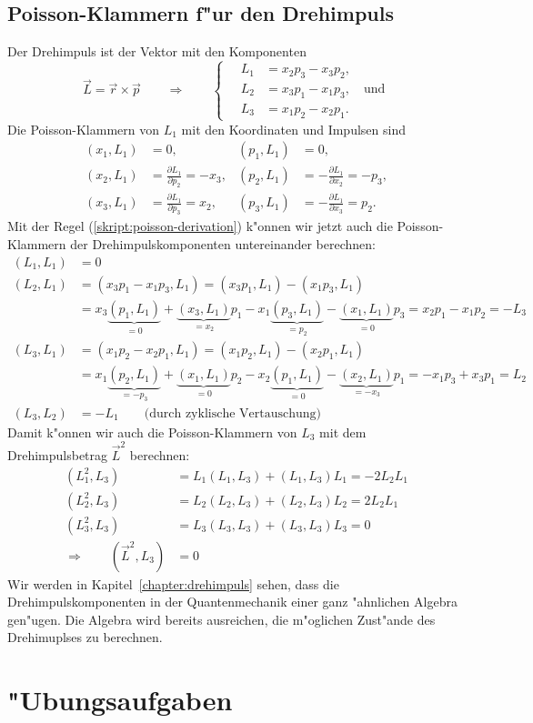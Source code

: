 \subsection{Poisson-Klammern f"ur den Drehimpuls}
Der Drehimpuls ist der Vektor mit den Komponenten
\[
\vec L=\vec r\times \vec p
\qquad\Rightarrow\qquad
\left\{\quad
\begin{aligned}
L_1&=x_2p_3-x_3p_2,\\
L_2&=x_3p_1-x_1p_3,\quad\text{und}\\
L_3&=x_1p_2-x_2p_1.
\end{aligned}
\right.
\]
Die Poisson-Klammern von $L_1$  mit den Koordinaten und Impulsen sind
\begin{align*}
(x_1,L_1)
&=
0,
&
(p_1,L_1)
&=
0,
\\
(x_2,L_1)
&=
\frac{\partial L_1}{\partial p_2}
=
-x_3,
&
(p_2,L_1)
&=
-\frac{\partial L_1}{\partial x_2}
=
-p_3,
\\
(x_3,L_1)
&=
\frac{\partial L_1}{\partial p_3}
=
x_2,
&
(p_3,L_1)
&=
-\frac{\partial L_1}{\partial x_3}
=
p_2.
\end{align*}
Mit der Regel (\ref{skript:poisson-derivation}) k"onnen wir jetzt auch die
Poisson-Klammern der Drehimpulskomponenten untereinander berechnen:
\begin{align*}
(L_1,L_1)&=0
\\
(L_2,L_1)
&=
(x_3p_1-x_1p_3,L_1)
=
(x_3p_1,L_1)-(x_1p_3,L_1)
\\
&=
x_3\underbrace{(p_1,L_1)}_{=0}+\underbrace{(x_3,L_1)}_{=x_2}p_1
-x_1\underbrace{(p_3,L_1)}_{=p_2} -\underbrace{(x_1,L_1)}_{=0}p_3
=
x_2p_1 -x_1p_2=-L_3
\\
(L_3,L_1)
&=
(x_1p_2-x_2p_1,L_1)
=
(x_1p_2,L_1)-(x_2p_1,L_1)
\\
&=
x_1\underbrace{(p_2,L_1)}_{=-p_3} + \underbrace{(x_1,L_1)}_{=0}p_2
- x_2\underbrace{(p_1,L_1)}_{=0} - \underbrace{(x_2,L_1)}_{=-x_3}p_1
=
-x_1p_3+x_3p_1
=L_2
\\
(L_3,L_2)&=-L_1\qquad\text{(durch zyklische Vertauschung)}
\end{align*}
Damit k"onnen wir auch die Poisson-Klammern von $L_3$ mit dem Drehimpulsbetrag
$\vec L^2$ berechnen:
\begin{align*}
(L_1^2,L_3)
&=
L_1(L_1,L_3)+(L_1,L_3)L_1
=
-2L_2L_1
\\
(L_2^2,L_3)
&=
L_2(L_2,L_3)+(L_2,L_3)L_2
=
2L_2L_1
\\
(L_3^2,L_3)&=L_3(L_3,L_3)+(L_3,L_3)L_3=0
\\
\Rightarrow\qquad
(\vec L^2,L_3)
&=0
\end{align*}
Wir werden in Kapitel~\ref{chapter:drehimpuls} sehen,
dass die Drehimpulskomponenten in der
Quantenmechanik einer ganz "ahnlichen Algebra gen"ugen.
Die Algebra wird bereits ausreichen, die m"oglichen Zust"ande
des Drehimuplses zu berechnen.


\section*{"Ubungsaufgaben}
\begin{uebungsaufgaben}
\item

\item

\end{uebungsaufgaben}

